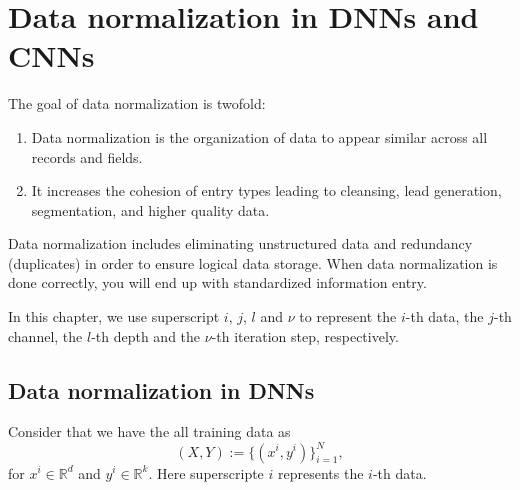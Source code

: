 \section{Data normalization in DNNs and CNNs}
The goal of data normalization is twofold:
\begin{enumerate}
\item Data normalization is the organization of data to appear similar across all records and fields.
\item It increases the cohesion of entry types leading to cleansing, lead generation, segmentation, and higher quality data.
\end{enumerate}
Data normalization includes eliminating unstructured data and redundancy (duplicates) in order to ensure logical data storage. When data normalization is done correctly, you will end up with standardized information entry.

In this chapter, we use superscript $i$, $j$, $l$ and $\nu$ to represent the $i$-th data, the $j$-th channel, the $l$-th depth and the $\nu$-th iteration step, respectively.

\subsection{Data normalization in DNNs}
Consider that we have the all training data as
\begin{equation}\label{eq:trainingdata}
(X,Y) := \{(x^i, y^i)\}_{i=1}^N,
\end{equation}
for $x^i \in \mathbb{R}^d$ and $y^i \in \mathbb{R}^k$. Here superscripte $i$ represents the $i$-th data.

